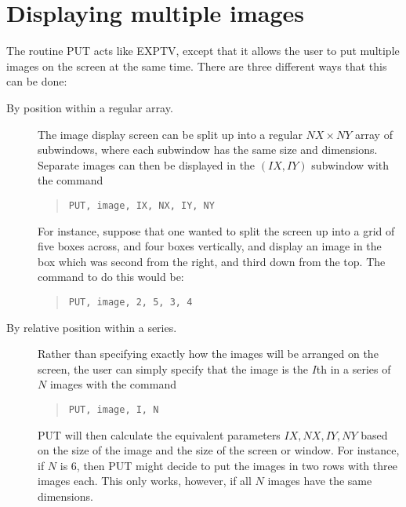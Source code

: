 \section{Displaying multiple images}

The routine PUT acts like EXPTV, except that it allows the user to put multiple
images on the screen at the same time.  There are three different ways that
this can be done:
\begin{description}
\item[By position within a regular array.]
The image display screen can be split up into a regular \mbox{$NX \times NY$}
array of subwindows, where each subwindow has the same size and dimensions.
Separate images can then be displayed in the $(IX,IY)$ subwindow with the command
\begin{quote}
\begin{verbatim}
PUT, image, IX, NX, IY, NY
\end{verbatim}
\end{quote}
For instance, suppose that one wanted to split the screen up into a grid of
five boxes across, and four boxes vertically, and display an image in the
box which was second from the right, and third down from the top.  The command
to do this would be:
\begin{quote}
\begin{verbatim}
PUT, image, 2, 5, 3, 4
\end{verbatim}
\end{quote}

\item[By relative position within a series.]
Rather than specifying exactly how the images will be arranged on the screen,
the user can simply specify that the image is the $I$th in a series of $N$
images with the command
\begin{quote}
\begin{verbatim}
PUT, image, I, N
\end{verbatim}
\end{quote}
PUT will then calculate the equivalent parameters $IX,NX,IY,NY$ based on the
size of the image and the size of the screen or window.  For instance, if $N$
is 6, then PUT might decide to put the images in two rows with three images
each.  This only works, however, if all $N$ images have the same dimensions.


\end{description}
